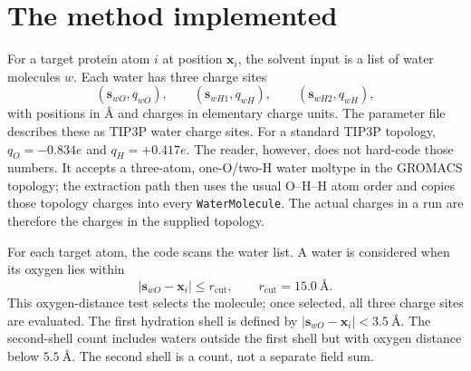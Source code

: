 \documentclass[11pt]{article}
\begin{document}
\section{The method implemented}

For a target protein atom \(i\) at position \(\bm x_i\), the solvent input is a
list of water molecules \(w\). Each water has three charge sites
\[
  (\bm s_{wO},q_{wO}),\qquad
  (\bm s_{wH1},q_{wH}),\qquad
  (\bm s_{wH2},q_{wH}),
\]
with positions in \(\si{\angstrom}\) and charges in elementary charge units.
The parameter file describes these as TIP3P water charge sites. For a standard
TIP3P topology, \(q_O=-0.834e\) and \(q_H=+0.417e\). The reader, however, does
not hard-code those numbers. It accepts a three-atom, one-O/two-H water
moltype in the GROMACS topology; the extraction path then uses the usual
O--H--H atom order and copies those topology charges into every
\texttt{WaterMolecule}. The actual charges in a run are therefore the charges
in the supplied topology.

For each target atom, the code scans the water list. A water is considered when
its oxygen lies within
\begin{equation}
  |\bm s_{wO}-\bm x_i| \le r_{\mathrm{cut}},
  \qquad r_{\mathrm{cut}}=\SI{15.0}{\angstrom}.
  \label{eq:oxygen-cutoff}
\end{equation}
This oxygen-distance test selects the molecule; once selected, all three charge
sites are evaluated. The first hydration shell is defined by
\(|\bm s_{wO}-\bm x_i|<\SI{3.5}{\angstrom}\). The second-shell count includes
waters outside the first shell but with oxygen distance below
\(\SI{5.5}{\angstrom}\). The second shell is a count, not a separate field
sum.
\end{document}
